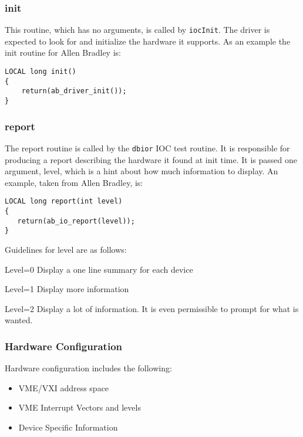 \subsubsection{init}

This routine, which has no arguments, is called by \verb|iocInit|. The driver is expected to look for and initialize the 
hardware it supports. As an example the init routine for Allen Bradley is:

\begin{verbatim}
LOCAL long init()
{
    return(ab_driver_init());
}
\end{verbatim}

\subsubsection{report}

The report routine is called by the \verb|dbior| IOC test routine. It is responsible for producing a report describing the 
hardware it found at init time. It is passed one argument, level, which is a hint about how much information to display. An 
example, taken from Allen Bradley, is:

\begin{verbatim}
LOCAL long report(int level)
{
   return(ab_io_report(level));
}
\end{verbatim}

Guidelines for level are as follows:

\begin{description}
\item Level=0 Display a one line summary for each device

\item Level=1 Display more information

\item Level=2 Display a lot of information. It is even permissible to prompt for what is wanted.

\end{description}

\subsubsection{Hardware Configuration}

Hardware configuration includes the following:

\begin{itemize}
\item VME/VXI address space

\item VME Interrupt Vectors and levels

\item Device Specific Information

\end{itemize}

